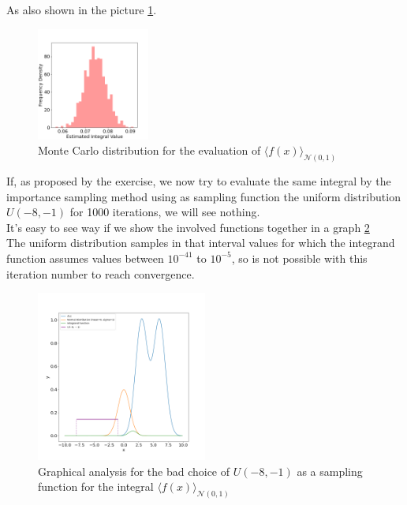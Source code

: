 As also shown in the picture \ref{crude_mc_integral2}.

\begin{figure}
  \vspace{-25pt}
  \centering
  \includegraphics[width=0.33\textwidth]{FIG/exercise_3_images/distribution_crude_mc_ex2.png}
\caption{Monte Carlo distribution for the evaluation of $\langle f(x) \rangle_{\mathcal{N}(0,1)}$}
\label{crude_mc_integral2}
\end{figure}

If, as proposed by the exercise, we now try to evaluate the same integral by the importance sampling 
method using as sampling function the uniform distribution $U(-8, -1)$ for 1000 iterations, we will see nothing. \\
It's easy to see way if we show the involved functions together in a graph \ref{badchoice} \\
The uniform distribution samples in that interval values for which the integrand function assumes values between $10^{-41}$ to $10^{-5}$, 
so is not possible with this iteration number to reach convergence.  

\begin{figure}[H]
  \centering
  \includegraphics[width=0.5\textwidth]{FIG/exercise_3_images/distribution_consideration.png}
  \caption{Graphical analysis for the bad choice of $U(-8,-1)$ as a sampling function for the integral $\langle f(x) \rangle_{\mathcal{N}(0,1)}$}
  \label{badchoice}
  \end{figure}

